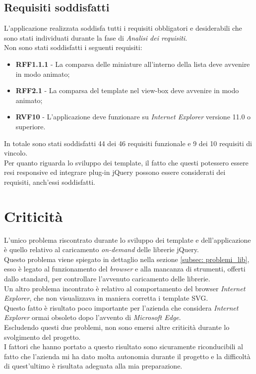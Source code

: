 \subsection{Requisiti soddisfatti}
L'applicazione realizzata soddisfa tutti i requisiti obbligatori e desiderabili che sono stati individuati durante la fase di \textit{Analisi dei requisiti}.\\
Non sono stati soddisfatti i seguenti requisiti:
\begin{itemize}
	\item \textbf{RFF1.1.1} - La comparsa delle miniature all'interno della lista deve avvenire in modo animato;
	\item \textbf{RFF2.1} - La comparsa del template nel view-box deve avvenire in modo animato;
	\item \textbf{RVF10} - L'applicazione deve funzionare su \textit{Internet Explorer} versione 11.0 o superiore.
\end{itemize}
In totale sono stati soddisfatti 44 dei 46 requisiti funzionale e 9 dei 10 requisiti di vincolo.\\
Per quanto riguarda lo sviluppo dei template, il fatto che questi potessero essere resi responsive ed integrare plug-in jQuery possono essere considerati dei requisiti, anch'essi soddisfatti.
\section{Criticità}
L'unico problema riscontrato durante lo sviluppo dei template e dell'applicazione è quello relativo al caricamento \textit{on-demand} delle librerie jQuery.\\
Questo problema viene spiegato in dettaglio nella sezione \ref{subsec: problemi_lib}, esso è legato al funzionamento del \textit{browser} e alla mancanza di strumenti, offerti dallo standard, per controllare l'avvenuto caricamento delle librerie.\\
Un altro problema incontrato è relativo al comportamento del browser \textit{Internet Explorer}, che non visualizzava in maniera corretta i template SVG.\\
Questo fatto è risultato poco importante per l'azienda che considera \textit{Internet Explorer} ormai obsoleto dopo l'avvento di \textit{Microsoft Edge}.\\
Escludendo questi due problemi, non sono emersi altre criticità durante lo svolgimento del progetto.\\
I fattori che hanno portato a questo risultato sono sicuramente riconducibili al fatto che l'azienda mi ha dato molta autonomia durante il progetto e la difficoltà di quest'ultimo è risultata adeguata alla mia preparazione.
 
